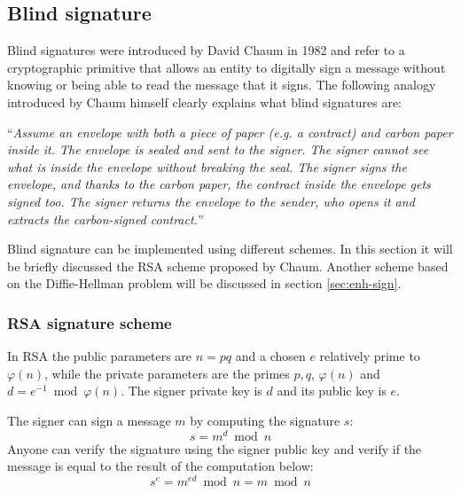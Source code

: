 \subsection{Blind signature} Blind signatures were introduced by David Chaum in
1982 \cite{chaum1982blind} and refer to a cryptographic primitive that allows an
entity to digitally sign a message without knowing or being able to read the
message that it signs. The following analogy introduced by Chaum himself clearly
explains what blind signatures are:

``\emph{Assume an envelope with both a piece of paper (e.g. a contract) and carbon
paper inside it. The envelope is sealed and sent to the signer. The signer
cannot see what is inside the envelope without breaking the seal. The signer
signs the envelope, and thanks to the carbon paper, the contract inside the
envelope gets signed too. The signer returns the envelope to the sender, who
opens it and extracts the carbon-signed contract.}''

Blind signature can be implemented using different schemes. In this section it will be
briefly discussed the RSA scheme proposed by Chaum. Another scheme based on the
Diffie-Hellman problem will be discussed in section \ref{sec:enh-sign}.

\subsubsection{RSA signature scheme} In RSA the public parameters are $n=pq$ and
a chosen $e$ relatively prime to $\varphi(n)$, while the private parameters are
the primes $p,q$, $\varphi(n)$ and \mbox{$d=e^{-1}\bmod\varphi(n)$}. The signer private
key is $d$ and its public key is $e$.

The signer can sign a message $m$ by computing the signature $s$:
\[ s=m^d\bmod n \]
Anyone can verify the signature using the signer public key and verify if the message
is equal to the result of the computation below:
\[ s^e = m^{ed}\bmod n= m \bmod n \]


